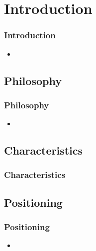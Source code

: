 
\section{Introduction}
\begin{frame}
    \frametitle{Introduction}
    \vspace{5mm}
    
    \begin{itemize}
      \item 
    \end{itemize}
\end{frame}

\subsection{Philosophy}
\begin{frame}
    \frametitle{Philosophy}
    \vspace{5mm}
    
    \begin{itemize}
      \item 
    \end{itemize}
\end{frame}

\subsection{Characteristics}
\begin{frame}
    \frametitle{Characteristics}
    \vspace{5mm}
    
    \begin{itemize}
      \descitem{}
    \end{itemize}
\end{frame}

\subsection{Positioning}
\begin{frame}
    \frametitle{Positioning}
    \vspace{5mm}
    
    \begin{itemize}
      \item 
    \end{itemize}
\end{frame}

